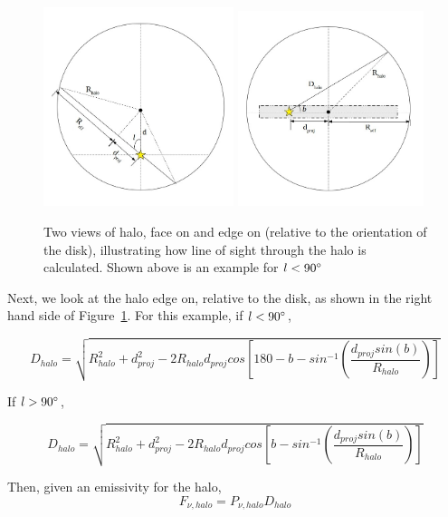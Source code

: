 \documentclass[letterpaper, 10pt]{article}
\begin{document}
\begin{figure}[h]
\begin{center}
\includegraphics[width=0.495\textwidth]{halo_face.jpg}
\includegraphics[width=0.485\textwidth]{halo_edge.jpg}
\caption{Two views of halo, face on and edge on (relative to the orientation of the disk), illustrating how line of sight through the halo is calculated. Shown above is an example for $ l < 90\degree$}
\label{halo}
\end{center}
\end{figure}

Next, we look at the halo edge on, relative to the disk, as shown in the right hand side of Figure~\ref{halo}.  For this example, if $ l < 90\degree$, 

\[ D_{halo} = \sqrt{R_{halo}^{2} + d_{proj}^{2} - 2R_{halo}d_{proj}cos\left[180 - b - sin^{-1}\left(\frac{d_{proj}sin(b)}{R_{halo}}\right)\right] }  \]

If $l > 90\degree$, 

\[ D_{halo} = \sqrt{R_{halo}^{2} + d_{proj}^{2} - 2R_{halo}d_{proj}cos\left[b - sin^{-1}\left(\frac{d_{proj}sin(b)}{R_{halo}}\right)\right] }  \]

Then, given an emissivity for the halo, 
\[F_{\nu, halo} = P_{\nu, halo}D_{halo} \]
\end{document}
